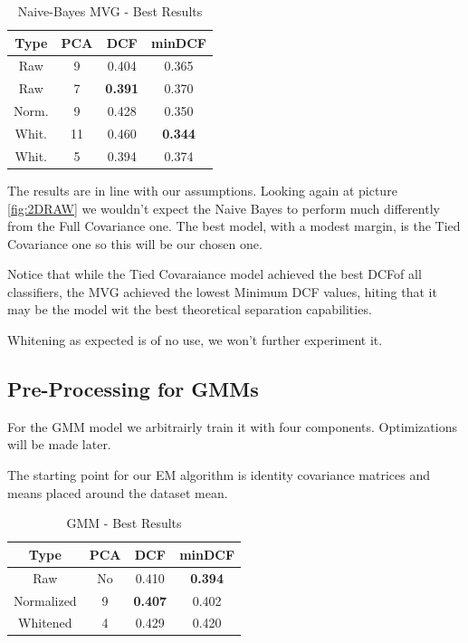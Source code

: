 \documentclass[hidelinks, 12pt, twocolumn]{article}
\begin{document}
\begin{table}[H]
    \centering
        \begin{tabular}{||c|c|c|c||}
            \hline
            Type & PCA & DCF & minDCF \\
            \hline
            \hline
            Raw   & 9  & 0.404 &  0.365 \\
            Raw   & 7  & {\bf 0.391} &  0.370 \\
            Norm. & 9  & 0.428 &  0.350 \\
            Whit. & 11 & 0.460 &  {\bf 0.344} \\
            Whit. & 5  & 0.394 &  0.374 \\
            \hline
    \end{tabular}
    \caption{Naive-Bayes MVG - Best Results}
    \label{naivetab}
\end{table}

The results are in line with our assumptions.
Looking again at picture \ref{fig:2DRAW} we wouldn't expect the Naive Bayes to perform much differently from the Full Covariance one.
The best model, with a modest margin, is the Tied Covariance one so
this will be our chosen one.

Notice that while the Tied Covaraiance model achieved the best DCF\footnotemark of all classifiers,
the MVG achieved the lowest Minimum DCF values, hiting that it may be the model
wit the best theoretical separation capabilities.

Whitening as expected is of no use, we won't further experiment it.

\subsection{Pre-Processing for GMMs}

For the GMM model we arbitrairly train it with four components.
Optimizations will be made later.

The starting point for our EM algorithm is identity covariance matrices and means placed around the dataset mean.

\begin{table}[H]
    \centering
        \begin{tabular}{||c|c|c|c||}
            \hline
            Type & PCA & DCF & minDCF \\
            \hline
            \hline
            Raw & No & 0.410 & {\bf 0.394}  \\
            Normalized &  9 & {\bf 0.407} & 0.402 \\
            Whitened & 4 & 0.429 & 0.420 \\
            \hline
    \end{tabular}
    \caption{GMM - Best Results}
    \label{tab:gmmresults}
\end{table}
\end{document}
